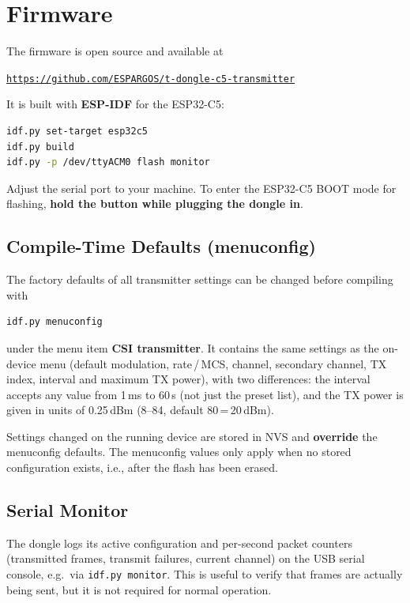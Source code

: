 \documentclass[a5paper, 10pt, twoside]{article}
\begin{document}
\section{Firmware}
\label{sec:firmware}

The firmware is open source and available at
\begin{center}
\href{https://github.com/ESPARGOS/t-dongle-c5-transmitter}%
     {\texttt{https://github.com/ESPARGOS/t-dongle-c5-transmitter}}
\end{center}
It is built with \textbf{ESP-IDF} for the ESP32-C5:

\begin{lstlisting}[language=bash]
idf.py set-target esp32c5
idf.py build
idf.py -p /dev/ttyACM0 flash monitor
\end{lstlisting}

Adjust the serial port to your machine. To enter the ESP32-C5 BOOT mode for
flashing, \textbf{hold the button while plugging the dongle in}.

\subsection{Compile-Time Defaults (menuconfig)}
The factory defaults of all transmitter settings can be changed before
compiling with

\begin{lstlisting}[language=bash]
idf.py menuconfig
\end{lstlisting}

under the menu item \textbf{CSI transmitter}. It contains the same settings
as the on-device menu (default modulation, rate\,/\,MCS, channel, secondary
channel, TX index, interval and maximum TX power), with two differences:
the interval accepts any value from 1\,ms to 60\,s (not just the preset
list), and the TX power is given in units of 0.25\,dBm (8--84, default
80\,=\,20\,dBm).

\begin{notebox}
Settings changed on the running device are stored in NVS and
\textbf{override} the menuconfig defaults. The menuconfig values only apply
when no stored configuration exists, i.e., after the flash has been erased.
\end{notebox}

\subsection{Serial Monitor}
The dongle logs its active configuration and per-second packet counters
(transmitted frames, transmit failures, current channel) on the USB serial
console, e.g.\ via \texttt{idf.py monitor}. This is useful to verify that
frames are actually being sent, but it is not required for normal operation.
\end{document}
